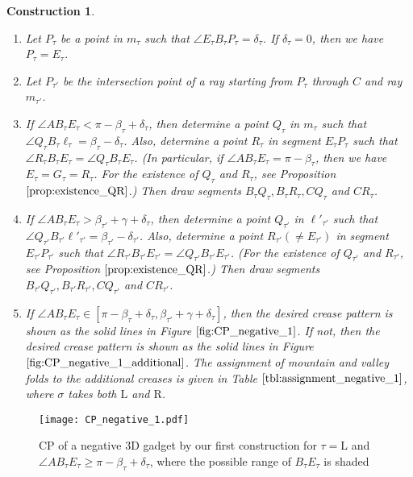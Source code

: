 \documentclass[11pt]{amsart}
\newtheorem{construction}[theorem]{Construction}
\numberwithin{equation}{section}
\numberwithin{theorem}{section}
\newcommand{\Lt}{\ensuremath{\mathrm{L}}}
\newcommand{\Rt}{\ensuremath{\mathrm{R}}}
\begin{document}
\begin{construction}
\begin{enumerate}[(1)]
If we choose $\angle AB_\tau E_\tau =\pi -\beta_\tau +\gamma /2+\delta_\Lt +\delta_\Rt$ in $\eqref{ineq:range_ABE_1}$, then we have $G_{\tau'}=E_{\tau'}$.
\item Let $P_\tau$ be a point in $m_\tau$ such that $\angle E_\tau B_\tau P_\tau =\delta_\tau$.
If $\delta_\tau =0$, then we have $P_\tau =E_\tau$.
\item Let $P_{\tau'}$ be the intersection point of a ray starting from $P_\tau$ through $C$ and ray $m_{\tau'}$.
\item If $\angle AB_\tau E_\tau <\pi -\beta_\tau +\delta_\tau$,
then determine a point $Q_\tau$ in $m_\tau$ such that $\angle Q_\tau B_\tau\ell_\tau =\beta_\tau -\delta_\tau$.
Also, determine a point $R_\tau$ in segment $E_\tau P_\tau$ such that $\angle R_\tau B_\tau E_\tau =\angle Q_\tau B_\tau E_\tau$.
(In particular, if $\angle AB_\tau E_\tau =\pi -\beta_\tau$, then we have $E_\tau =G_\tau =R_\tau$.
For the existence of $Q_\tau$ and $R_\tau$, see Proposition $\ref{prop:existence_QR}$.)
Then draw segments $B_\tau Q_\tau ,B_\tau R_\tau ,CQ_\tau$ and $CR_\tau$.
\item If $\angle AB_\tau E_\tau >\beta_{\tau'}+\gamma +\delta_\tau$,
then determine a point $Q_{\tau'}$ in $\ell'_{\tau'}$ such that $\angle Q_{\tau'}B_{\tau'}\ell'_{\tau'}=\beta_{\tau'}-\delta_{\tau'}$.
Also, determine a point $R_{\tau'} (\neq E_{\tau'})$ in segment $E_{\tau'}P_{\tau'}$ such that
$\angle R_{\tau'}B_{\tau'}E_{\tau'}=\angle Q_{\tau'}B_{\tau'}E_{\tau'}$.
(For the existence of $Q_{\tau'}$ and $R_{\tau'}$, see Proposition $\ref{prop:existence_QR}$.)
Then draw segments $B_{\tau'}Q_{\tau'},B_{\tau'}R_{\tau'},CQ_{\tau'}$ and $CR_{\tau'}$.
\item If $\angle AB_\tau E_\tau\in [\pi -\beta_\tau +\delta_\tau ,\beta_{\tau'}+\gamma +\delta_\tau ]$, 
then the desired crease pattern is shown as the solid lines in Figure $\ref{fig:CP_negative_1}$.
If not, then the desired crease pattern is shown as the solid lines in Figure $\ref{fig:CP_negative_1_additional}$.
The assignment of mountain and valley folds to the additional creases is given in Table $\ref{tbl:assignment_negative_1}$,
where $\sigma$ takes both $\Lt$ and $\Rt$.
\end{enumerate}
\end{construction}
\begin{figure}[htbp]
\addtocounter{theorem}{1}
\centering\texttt{[image: CP\_negative\_1.pdf]}
    \caption{CP of a negative $3$D gadget by our first construction for $\tau =\Lt$ and $\angle AB_\tau E_\tau\geqslant\pi -\beta_\tau +\delta_\tau$, 
    where the possible range of $B_\tau E_\tau$ is shaded}
    \label{fig:CP_negative_1}
\end{figure}
\end{document}
